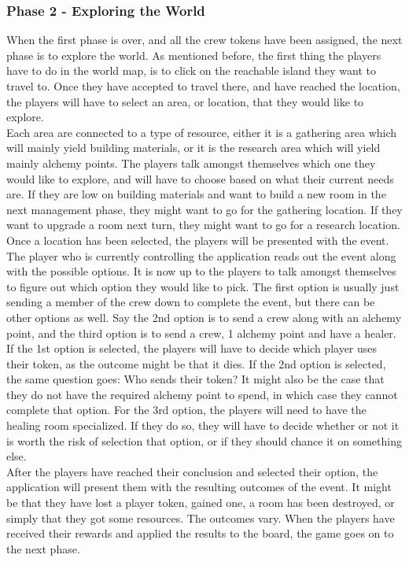 \subsubsection{Phase 2 - Exploring the World}
When the first phase is over, and all the crew tokens have been assigned, the next phase is to explore the world.
As mentioned before, the first thing the players have to do in the world map, is to click on the reachable island they want to travel to. Once they have accepted to travel there, and have reached the location, the players will have to select an area, or location, that they would like to explore.\\
Each area are connected to a type of resource, either it is a gathering area which will mainly yield building materials, or it is the research area which will yield mainly alchemy points.
The players talk amongst themselves which one they would like to explore, and will have to choose based on what their current needs are. If they are low on building materials and want to build a new room in the next management phase, they might want to go for the gathering location. If they want to upgrade a room next turn, they might want to go for a research location.\\
Once a location has been selected, the players will be presented with the event.
The player who is currently controlling the application reads out the event along with the possible options.
It is now up to the players to talk amongst themselves to figure out which option they would like to pick. The first option is usually just sending a member of the crew down to complete the event, but there can be other options as well. Say the 2nd option is to send a crew along with an alchemy point, and the third option is to send a crew, 1 alchemy point and have a healer. 
If the 1st option is selected, the players will have to decide which player uses their token, as the outcome might be that it dies.
If the 2nd option is selected, the same question goes: Who sends their token? It might also be the case that they do not have the required alchemy point to spend, in which case they cannot complete that option.
For the 3rd option, the players will need to have the healing room specialized. If they do so, they will have to decide whether or not it is worth the risk of selection that option, or if they should chance it on something else.\\
After the players have reached their conclusion and selected their option, the application will present them with the resulting outcomes of the event. It might be that they have lost a player token, gained one, a room has been destroyed, or simply that they got some resources. The outcomes vary.
When the players have received their rewards and applied the results to the board, the game goes on to the next phase.

